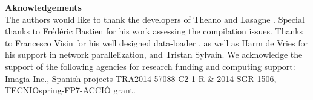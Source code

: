 \documentclass[10pt,twocolumn,letterpaper]{article}
\begin{document}
\textbf{Aknowledgements} \\

The authors would like to thank the developers of Theano \cite{Theano} and Lasagne \cite{lasagne}. Special thanks to Fr\'{e}d\'{e}ric Bastien for his work assessing the compilation issues. Thanks to Francesco Visin for his well designed data-loader \cite{Visin}, as well as Harm de Vries for his support in network parallelization, and Tristan Sylvain. We acknowledge the support of the following agencies for research funding and computing support: Imagia Inc., Spanish projects TRA2014-57088-C2-1-R \& 2014-SGR-1506, TECNIOspring-FP7-ACCIÓ grant.


{\small


}
\end{document}
